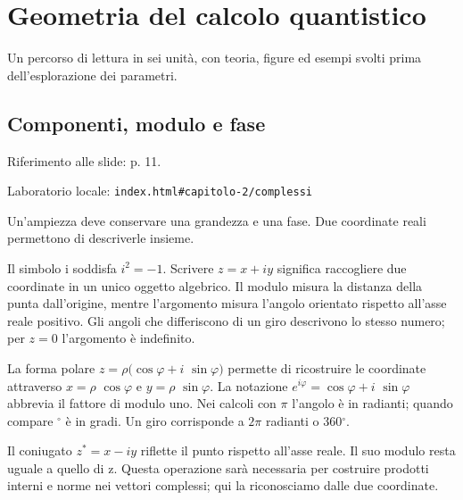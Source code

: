\setcounter{chapter}{1}
\chapter{Geometria del calcolo quantistico}
\label{chapter-2}

Un percorso di lettura in sei unità, con teoria, figure ed esempi svolti prima dell'esplorazione dei parametri.\par



\Needspace{.43\textheight}
\section{Componenti, modulo e fase}
\label{c2-complessi}

{\sffamily\small\color{Ink!70} Riferimento alle slide: p. 11.\par}

{\sffamily\small\color{Ink!70} Laboratorio locale: \nolinkurl{index.html#capitolo-2/complessi}\par}

Un'ampiezza deve conservare una grandezza e una fase. Due coordinate reali permettono di descriverle insieme.\par

Il simbolo i soddisfa \(i^{2}=- 1\). Scrivere \(z=x+iy\) significa raccogliere due coordinate in un unico oggetto algebrico. Il modulo misura la distanza della punta dall'origine, mentre l'argomento misura l'angolo orientato rispetto all'asse reale positivo. Gli angoli che differiscono di un giro descrivono lo stesso numero; per \(z=0\) l'argomento è indefinito.\par

La forma polare \(z=\rho (\cos \varphi +i\) \(\sin \varphi )\) permette di ricostruire le coordinate attraverso \(x=\rho \) \(\cos \varphi \) e \(y=\rho \) \(\sin \varphi \). La notazione \(e^{i\varphi }=\cos \varphi +i\) \(\sin \varphi \) abbrevia il fattore di modulo uno. Nei calcoli con \(\pi \) l'angolo è in radianti; quando compare \({}^{\circ} \) è in gradi. Un giro corrisponde a \(2\pi \) radianti o \(360{}^{\circ} \).\par

Il coniugato \(z{}^{*}=x- iy\) riflette il punto rispetto all'asse reale. Il suo modulo resta uguale a quello di z. Questa operazione sarà necessaria per costruire prodotti interni e norme nei vettori complessi; qui la riconosciamo dalle due coordinate.\par


